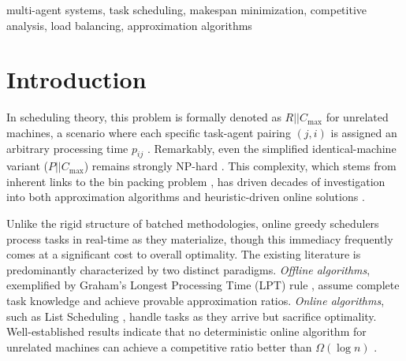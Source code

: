 \documentclass[conference]{IEEEtran}
\begin{document}
\begin{IEEEkeywords}
multi-agent systems, task scheduling, makespan minimization, competitive analysis, load balancing, approximation algorithms
\end{IEEEkeywords}

\section{Introduction}

In scheduling theory, this problem is formally denoted as $R||C_{\max}$ for unrelated machines, a scenario where each specific task-agent pairing $(j, i)$ is assigned an arbitrary processing time $p_{ij}$ \cite{lenstra1990}. Remarkably, even the simplified identical-machine variant ($P||C_{\max}$) remains strongly NP-hard \cite{garey1979}. This complexity, which stems from inherent links to the bin packing problem \cite{coffman1978}, has driven decades of investigation into both approximation algorithms and heuristic-driven online solutions \cite{borodin1998}.

Unlike the rigid structure of batched methodologies, online greedy schedulers process tasks in real-time as they materialize, though this immediacy frequently comes at a significant cost to overall optimality. The existing literature is predominantly characterized by two distinct paradigms. \emph{Offline algorithms}, exemplified by Graham's Longest Processing Time (LPT) rule \cite{graham1969}, assume complete task knowledge and achieve provable approximation ratios. \emph{Online algorithms}, such as List Scheduling \cite{graham1966}, handle tasks as they arrive but sacrifice optimality. Well-established results indicate that no deterministic online algorithm for unrelated machines can achieve a competitive ratio better than $\Omega(\log n)$ \cite{aspnes1997}.
\end{document}
